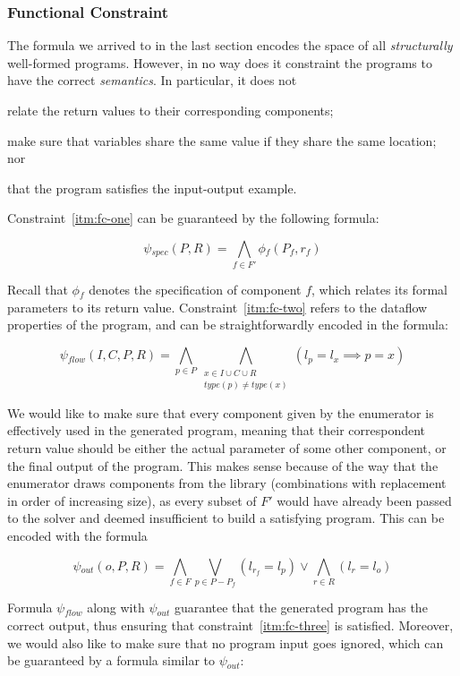 \subsubsection{Functional Constraint}
\label{sec:functional-constraint}

The formula we arrived to in the last section encodes the space of all
\textit{structurally} well-formed programs. However, in no way does it
constraint the programs to have the correct \textit{semantics}. In particular,
it does not
\begin{enumerate*}[(1)]
\item \label{itm:fc-one} relate the return values to their corresponding components;
\item \label{itm:fc-two} make sure that variables share the same value if they share the same
location; nor
\item \label{itm:fc-three} that the program satisfies the input-output example.
\end{enumerate*}
Constraint~\ref{itm:fc-one} can be guaranteed by the following formula:

\[
  \psi{}_{spec}(P, R) = \bigwedge_{f \in F'} \phi{}_f (P_f, r_f)
\]

\noindent
Recall that $\phi{}_f$ denotes the specification of component $f$, which relates
its formal parameters to its return value. Constraint~\ref{itm:fc-two} refers to
the dataflow properties of the program, and can be straightforwardly encoded in
the formula:

\[
  \psi{}_{flow}(I, C, P, R) =
    \bigwedge_{p \in P}
    \bigwedge_{\substack{x \in I \cup C \cup R \\ type(p) \neq type(x)}} 
    (l_p = l_x \implies p = x)
\]

We would like to make sure that every component given by the enumerator is
effectively used in the generated program, meaning that their correspondent
return value should be either the actual parameter of some other component, or
the final output of the program. This makes sense because of the way that the
enumerator draws components from the library (combinations with replacement in
order of increasing size), as every subset of $F'$ would have already been
passed to the solver and deemed insufficient to build a satisfying program. This
can be encoded with the formula

\[
  \psi{}_{out}(o, P, R) =
  \bigwedge_{f \in F}\bigvee_{p \in P - P_f}(l_{r_f} = l_p)
  \vee \bigwedge_{r \in R} (l_{r} = l_o)
\]

\noindent
Formula $\psi{}_{flow}$ along with $\psi{}_{out}$ guarantee that the generated
program has the correct output, thus ensuring that constraint~\ref{itm:fc-three}
is satisfied. Moreover, we would also like to make sure that no program input
goes ignored, which can be guaranteed by a formula similar to $\psi{}_{out}$:

